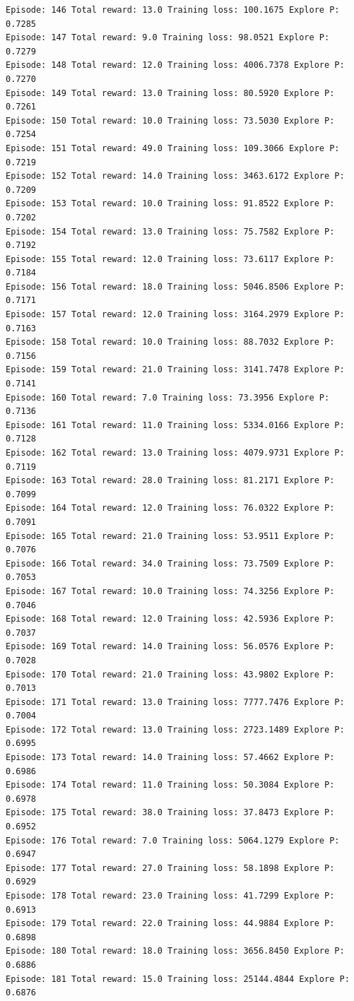 \documentclass[11pt]{article}
\begin{document}
\begin{Verbatim}[commandchars=\\\{\}]
Episode: 146 Total reward: 13.0 Training loss: 100.1675 Explore P: 0.7285
Episode: 147 Total reward: 9.0 Training loss: 98.0521 Explore P: 0.7279
Episode: 148 Total reward: 12.0 Training loss: 4006.7378 Explore P: 0.7270
Episode: 149 Total reward: 13.0 Training loss: 80.5920 Explore P: 0.7261
Episode: 150 Total reward: 10.0 Training loss: 73.5030 Explore P: 0.7254
Episode: 151 Total reward: 49.0 Training loss: 109.3066 Explore P: 0.7219
Episode: 152 Total reward: 14.0 Training loss: 3463.6172 Explore P: 0.7209
Episode: 153 Total reward: 10.0 Training loss: 91.8522 Explore P: 0.7202
Episode: 154 Total reward: 13.0 Training loss: 75.7582 Explore P: 0.7192
Episode: 155 Total reward: 12.0 Training loss: 73.6117 Explore P: 0.7184
Episode: 156 Total reward: 18.0 Training loss: 5046.8506 Explore P: 0.7171
Episode: 157 Total reward: 12.0 Training loss: 3164.2979 Explore P: 0.7163
Episode: 158 Total reward: 10.0 Training loss: 88.7032 Explore P: 0.7156
Episode: 159 Total reward: 21.0 Training loss: 3141.7478 Explore P: 0.7141
Episode: 160 Total reward: 7.0 Training loss: 73.3956 Explore P: 0.7136
Episode: 161 Total reward: 11.0 Training loss: 5334.0166 Explore P: 0.7128
Episode: 162 Total reward: 13.0 Training loss: 4079.9731 Explore P: 0.7119
Episode: 163 Total reward: 28.0 Training loss: 81.2171 Explore P: 0.7099
Episode: 164 Total reward: 12.0 Training loss: 76.0322 Explore P: 0.7091
Episode: 165 Total reward: 21.0 Training loss: 53.9511 Explore P: 0.7076
Episode: 166 Total reward: 34.0 Training loss: 73.7509 Explore P: 0.7053
Episode: 167 Total reward: 10.0 Training loss: 74.3256 Explore P: 0.7046
Episode: 168 Total reward: 12.0 Training loss: 42.5936 Explore P: 0.7037
Episode: 169 Total reward: 14.0 Training loss: 56.0576 Explore P: 0.7028
Episode: 170 Total reward: 21.0 Training loss: 43.9802 Explore P: 0.7013
Episode: 171 Total reward: 13.0 Training loss: 7777.7476 Explore P: 0.7004
Episode: 172 Total reward: 13.0 Training loss: 2723.1489 Explore P: 0.6995
Episode: 173 Total reward: 14.0 Training loss: 57.4662 Explore P: 0.6986
Episode: 174 Total reward: 11.0 Training loss: 50.3084 Explore P: 0.6978
Episode: 175 Total reward: 38.0 Training loss: 37.8473 Explore P: 0.6952
Episode: 176 Total reward: 7.0 Training loss: 5064.1279 Explore P: 0.6947
Episode: 177 Total reward: 27.0 Training loss: 58.1898 Explore P: 0.6929
Episode: 178 Total reward: 23.0 Training loss: 41.7299 Explore P: 0.6913
Episode: 179 Total reward: 22.0 Training loss: 44.9884 Explore P: 0.6898
Episode: 180 Total reward: 18.0 Training loss: 3656.8450 Explore P: 0.6886
Episode: 181 Total reward: 15.0 Training loss: 25144.4844 Explore P: 0.6876

\end{Verbatim}
\end{document}
